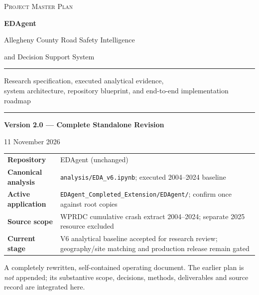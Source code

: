 \documentclass[11pt,a4paper,openany]{report}
\newcommand{\pathcode}[1]{\nolinkurl{#1}}
\begin{document}
\begin{titlepage}
\centering
\vspace*{22mm}
{\large\scshape Project Master Plan\par}
\vspace{13mm}
{\Huge\bfseries EDAgent\par}
\vspace{6mm}
{\Large Allegheny County Road Safety Intelligence\par}
{\Large and Decision Support System\par}
\vspace{15mm}
\rule{.79\textwidth}{.6pt}\par\vspace{9mm}
{\large Research specification, executed analytical evidence,\\system architecture, repository blueprint, and end-to-end implementation roadmap\par}
\vspace{10mm}\rule{.79\textwidth}{.6pt}\par
\vspace{16mm}
{\Large\bfseries Version 2.0 --- Complete Standalone Revision\par}
\vspace{3mm}
{\normalsize 11 November 2026\par}
\vfill
\begin{minipage}{.87\textwidth}
\begin{tabularx}{\linewidth}{@{}L{40mm}Y@{}}
\textbf{Repository} & EDAgent (unchanged)\\
\textbf{Canonical analysis} & \pathcode{analysis/EDA_v6.ipynb}; executed 2004--2024 baseline\\
\textbf{Active application} & \pathcode{EDAgent_Completed_Extension/EDAgent/}; confirm once against root copies\\
\textbf{Source scope} & WPRDC cumulative crash extract 2004--2024; separate 2025 resource excluded\\
\textbf{Current stage} & V6 analytical baseline accepted for research review; geography/site matching and production release remain gated\\
\end{tabularx}
\end{minipage}
\vspace{14mm}
{\small A completely rewritten, self-contained operating document. The earlier plan is \emph{not} appended; its substantive scope, decisions, methods, deliverables and source record are integrated here.}
\end{titlepage}
\end{document}
